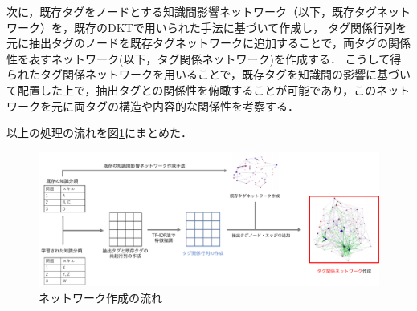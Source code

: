 次に，既存タグをノードとする知識間影響ネットワーク（以下，既存タグネットワーク）を，既存のDKTで用いられた手法に基づいて作成し，
タグ関係行列を元に抽出タグのノードを既存タグネットワークに追加することで，両タグの関係性を表すネットワーク(以下，タグ関係ネットワーク)を作成する．
こうして得られたタグ関係ネットワークを用いることで，既存タグを知識間の影響に基づいて配置した上で，抽出タグとの関係性を俯瞰することが可能であり，このネットワークを元に両タグの構造や内容的な関係性を考察する．

以上の処理の流れを図\ref{fig:networkflow}にまとめた．

\begin{figure}[htb]
\begin{center}
\includegraphics[width=400pt]{./img/networkflow.pdf}
\end{center}
\caption{ネットワーク作成の流れ}
\label{fig:networkflow}
\end{figure}


